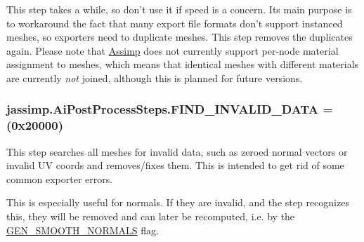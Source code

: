This step takes a while, so don't use it if speed is a concern. Its main purpose is to workaround the fact that many export file formats don't support instanced meshes, so exporters need to duplicate meshes. This step removes the duplicates again. Please note that \hyperlink{class_assimp}{Assimp} does not currently support per-\/node material assignment to meshes, which means that identical meshes with different materials are currently {\itshape not} joined, although this is planned for future versions. \hypertarget{enumjassimp_1_1_ai_post_process_steps_a391f51b2cf726a35d365a0a79ee16cbc}{
\subsubsection[{F\+I\+N\+D\+\_\+\+I\+N\+V\+A\+L\+I\+D\+\_\+\+D\+A\+T\+A}]{\setlength{\rightskip}{0pt plus 5cm}jassimp.\+Ai\+Post\+Process\+Steps.\+F\+I\+N\+D\+\_\+\+I\+N\+V\+A\+L\+I\+D\+\_\+\+D\+A\+T\+A =(0x20000)}}\label{enumjassimp_1_1_ai_post_process_steps_a391f51b2cf726a35d365a0a79ee16cbc}
This step searches all meshes for invalid data, such as zeroed normal vectors or invalid U\+V coords and removes/fixes them. This is intended to get rid of some common exporter errors.

This is especially useful for normals. If they are invalid, and the step recognizes this, they will be removed and can later be recomputed, i.\+e. by the \hyperlink{enumjassimp_1_1_ai_post_process_steps_a8467855f4e3d97235e27954a9c983fd4}{G\+E\+N\+\_\+\+S\+M\+O\+O\+T\+H\+\_\+\+N\+O\+R\+M\+A\+L\+S} flag.

